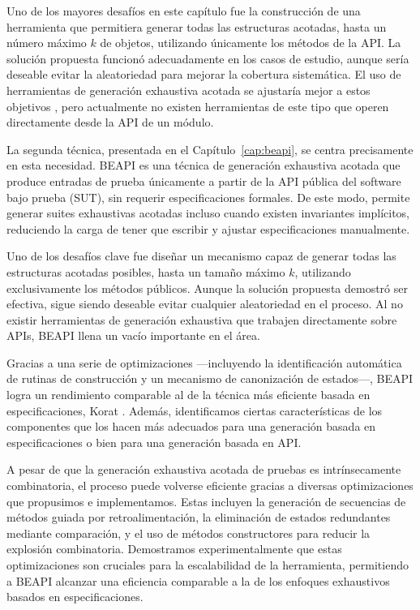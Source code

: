 Uno de los mayores desafíos en este capítulo fue la construcción de una herramienta que permitiera generar todas las estructuras acotadas, 
hasta un número máximo \(k\) de objetos, utilizando únicamente los métodos de la API. 
La solución propuesta funcionó adecuadamente en los casos de estudio, aunque sería deseable evitar la aleatoriedad para mejorar la cobertura sistemática. 
El uso de herramientas de generación exhaustiva acotada se ajustaría mejor a estos objetivos \cite{Boyapati02}, 
pero actualmente no existen herramientas de este tipo que operen directamente desde la API de un módulo.

La segunda técnica, presentada en el Capítulo~\ref{cap:beapi}, se centra precisamente en esta necesidad. 
BEAPI es una técnica de generación exhaustiva acotada que produce entradas de prueba únicamente a partir de la API pública del software bajo prueba (SUT), 
sin requerir especificaciones formales. De este modo, permite generar suites exhaustivas acotadas incluso cuando existen invariantes implícitos, 
reduciendo la carga de tener que escribir y ajustar especificaciones manualmente.

Uno de los desafíos clave fue diseñar un mecanismo capaz de generar todas las estructuras acotadas posibles, hasta un tamaño máximo \(k\), 
utilizando exclusivamente los métodos públicos. Aunque la solución propuesta demostró ser efectiva, sigue siendo deseable evitar cualquier aleatoriedad en el proceso. 
Al no existir herramientas de generación exhaustiva que trabajen directamente sobre APIs, BEAPI llena un vacío importante en el área.

Gracias a una serie de optimizaciones —incluyendo la identificación automática de rutinas de construcción y un mecanismo de canonización de estados—, 
BEAPI logra un rendimiento comparable al de la técnica más eficiente basada en especificaciones, Korat \cite{Boyapati02}. 
Además, identificamos ciertas características de los componentes que los hacen más adecuados para una generación basada en especificaciones o bien para una generación basada en API.

A pesar de que la generación exhaustiva acotada de pruebas es intrínsecamente combinatoria, 
el proceso puede volverse eficiente gracias a diversas optimizaciones que propusimos e implementamos. 
Estas incluyen la generación de secuencias de métodos guiada por retroalimentación, la eliminación de estados redundantes mediante comparación, 
y el uso de métodos constructores para reducir la explosión combinatoria. 
Demostramos experimentalmente que estas optimizaciones son cruciales para la escalabilidad de la herramienta, 
permitiendo a BEAPI alcanzar una eficiencia comparable a la de los enfoques exhaustivos basados en especificaciones.

